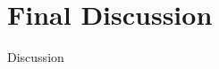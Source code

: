 
\chapter{Final Discussion}
\label{chap:discussion}
\renewcommand{\chapterheadstart}{~\vspace{1.7cm}\\}

Discussion